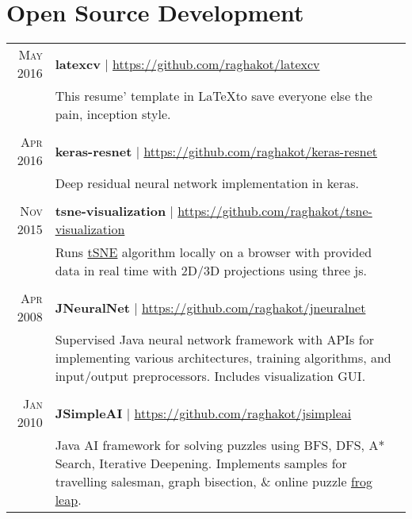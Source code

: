 \documentclass[a4paper,11pt]{article}
\begin{document}
\section{Open Source Development}
\begin{longtable}{r|p{12.5cm}}
\textsc{May 2016} & \normalsize \textbf{latexcv} | \href{https://github.com/raghakot/latexcv}{https://github.com/raghakot/latexcv} \\
& \footnotesize{ \begin{minipage}[t]{12.5cm} This resume' template in \LaTeX to save everyone else the pain, inception style.
 \end{minipage}}
  \\
 \multicolumn{2}{c}{}
 \\
\textsc{Apr 2016} & \normalsize \textbf{keras-resnet} | \href{https://github.com/raghakot/keras-resnet}{https://github.com/raghakot/keras-resnet} \\
& \footnotesize{ \begin{minipage}[t]{12.5cm} Deep residual neural network implementation in keras.
 \end{minipage}}
  \\
 \multicolumn{2}{c}{}
 \\
\textsc{Nov 2015} & \normalsize \textbf{tsne-visualization} | \href{https://github.com/raghakot/tsne-visualization}{https://github.com/raghakot/tsne-visualization} \\
& \footnotesize{ \begin{minipage}[t]{12.5cm} Runs \href{https://lvdmaaten.github.io/tsne/}{tSNE} algorithm locally on a browser with provided data in real time with 2D/3D projections using three js.
 \end{minipage}}
  \\
 \multicolumn{2}{c}{}
 \\
 \textsc{Apr 2008} & \textbf{JNeuralNet} | \href{https://github.com/raghakot/jneuralnet}{https://github.com/raghakot/jneuralnet} \\
 & \footnotesize{ \begin{minipage}[t]{12.5cm}
 Supervised Java neural network framework with APIs for implementing various architectures, training algorithms, and input/output preprocessors. Includes visualization GUI.
 \end{minipage}}
 \\
 \multicolumn{2}{c}{}
 \\
 \textsc{Jan 2010} & \normalsize \textbf{JSimpleAI} | \href{https://github.com/raghakot/jsimpleai}{https://github.com/raghakot/jsimpleai} \\
& \footnotesize{ \begin{minipage}[t]{12.5cm} Java AI framework for solving puzzles using BFS, DFS, A* Search, Iterative Deepening. Implements samples for travelling salesman, graph bisection, \& online puzzle \href{http://www.justriddlesandmore.com/frogleap.html}{frog leap}.
 \end{minipage}}\\
\end{longtable}
\end{document}
